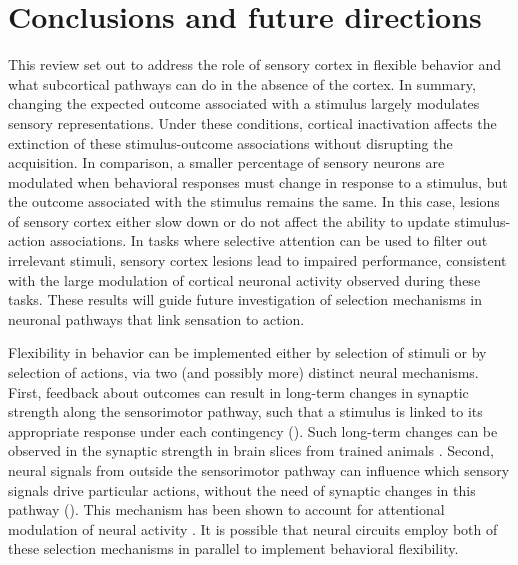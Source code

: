 \section{Conclusions and future directions}
This review set out to address the role of sensory cortex in flexible behavior and what subcortical pathways can do in the absence of the cortex.
%
In summary, changing the expected outcome associated with a stimulus largely modulates sensory representations. Under these conditions, cortical inactivation affects the extinction of these stimulus-outcome associations without disrupting the acquisition.
%
In comparison, a smaller percentage of sensory neurons are modulated when behavioral responses must change in response to a stimulus, but the outcome associated with the stimulus remains the same. In this case, lesions of sensory cortex either slow down or do not affect the ability to update stimulus-action associations.
%
In tasks where selective attention can be used to filter out irrelevant stimuli, sensory cortex lesions lead to impaired performance, consistent with the large modulation of cortical neuronal activity observed during these tasks.
%
These results will guide future investigation of selection mechanisms in neuronal pathways that link sensation to action. 

Flexibility in behavior can be implemented either by selection of stimuli or by selection of actions, via two (and possibly more) distinct neural mechanisms. First, feedback about outcomes can result in long-term changes in synaptic strength along the sensorimotor pathway, such that a stimulus is linked to its appropriate response under each contingency (\fig{\LTP}). Such long-term changes can be observed in the synaptic strength in brain slices from trained animals \citep{McKernan1997, Xiong2015}. Second, neural signals from outside the sensorimotor pathway can influence which sensory signals drive particular actions, without the need of synaptic changes in this pathway (\fig{\TopDown}). This mechanism has been shown to account for attentional modulation of neural activity \citep{Jaramillo2007}. 
%
It is possible that neural circuits employ both of these selection mechanisms in parallel to implement behavioral flexibility.

